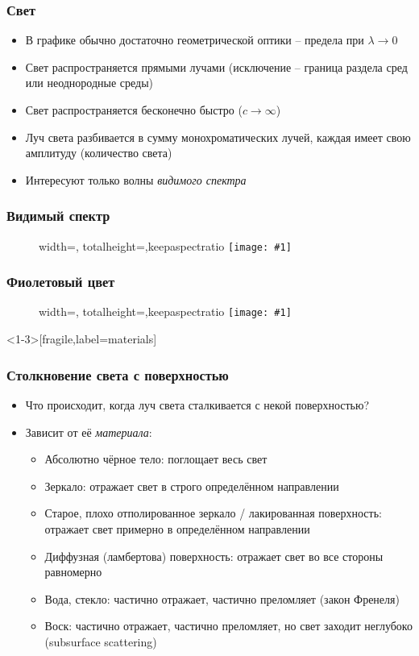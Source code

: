 \documentclass{beamer}
\newcommand{\slideimage}[1]{
  \begin{figure}
    \begin{adjustbox}{width=\textwidth, totalheight=\textheight-2\baselineskip-2\baselineskip,keepaspectratio}
      \texttt{[image: \#1]}
    \end{adjustbox}
  \end{figure}
}
\begin{document}
\begin{frame}[fragile]
\frametitle{Свет}
\begin{itemize}
\item В графике обычно достаточно геометрической оптики -- предела при \begin{math}\lambda\rightarrow 0\end{math}
\pause
\item Свет распространяется прямыми лучами (исключение -- граница раздела сред или неоднородные среды)
\pause
\item Свет распространяется бесконечно быстро (\begin{math}c \rightarrow \infty\end{math})
\pause
\item Луч света разбивается в сумму монохроматических лучей, каждая имеет свою амплитуду (количество света)
\pause
\item Интересуют только волны \textit{видимого спектра}
\end{itemize}
\end{frame}

\begin{frame}[fragile]
\frametitle{Видимый спектр}
\slideimage{visible-spectrum.jpg}
\end{frame}

\begin{frame}[fragile]
\frametitle{Фиолетовый цвет}
\slideimage{blue-red-spectrum.png}
\end{frame}

\begin{frame}<1-3>[fragile,label=materials]
\frametitle{Столкновение света с поверхностью}
\begin{itemize}
\item Что происходит, когда луч света сталкивается с некой поверхностью?
\pause
\item Зависит от её \textit{материала}:
\pause
\begin{itemize}
\item Абсолютно чёрное тело: поглощает весь свет
\pause
\item Зеркало: отражает свет в строго определённом направлении
\pause
\item Старое, плохо отполированное зеркало / лакированная поверхность: отражает свет примерно в определённом направлении
\pause
\item Диффузная (ламбертова) поверхность: отражает свет во все стороны равномерно
\pause
\item Вода, стекло: частично отражает, частично преломляет (закон Френеля)
\pause
\item Воск: частично отражает, частично преломляет, но свет заходит неглубоко (subsurface scattering)
\end{itemize}
\end{itemize}
\end{frame}
\end{document}
